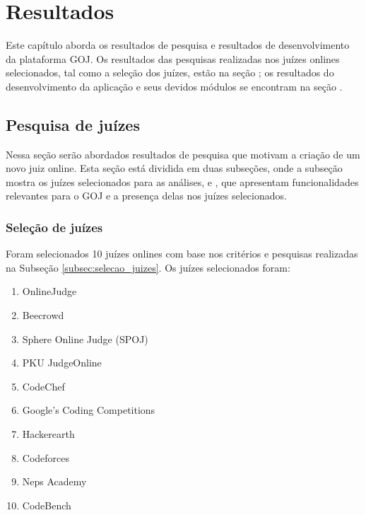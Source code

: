 \chapter{Resultados}
\label{cap:resultados}

Este capítulo aborda os resultados de pesquisa e resultados de desenvolvimento da plataforma GOJ. Os resultados das pesquisas realizadas nos juízes onlines selecionados, tal como a seleção dos juízes, estão na seção ; os resultados do desenvolvimento da aplicação e seus devidos módulos se encontram na seção .

\section{Pesquisa de juízes}
\label{sec:pesquisa_juizes}

Nessa seção serão abordados resultados de pesquisa que motivam a criação de um novo juiz online. Esta seção está dividida em duas subseções, onde a subseção  mostra os juízes selecionados para as análises, e , que apresentam funcionalidades relevantes para o GOJ e a presença delas nos juízes selecionados.

\subsection{Seleção de juízes}
\label{subsec:resultados_selecao_juizes}

Foram selecionados 10 juízes onlines com base nos critérios e pesquisas realizadas na Subseção \ref{subsec:selecao_juizes}. Os juízes selecionados foram:

\begin{enumerate}
    \item OnlineJudge
    \item Beecrowd
    \item Sphere Online Judge (SPOJ)
    \item PKU JudgeOnline
    \item CodeChef
    \item Google's Coding Competitions
    \item Hackerearth
    \item Codeforces
    \item Neps Academy 
    \item CodeBench
\end{enumerate}

